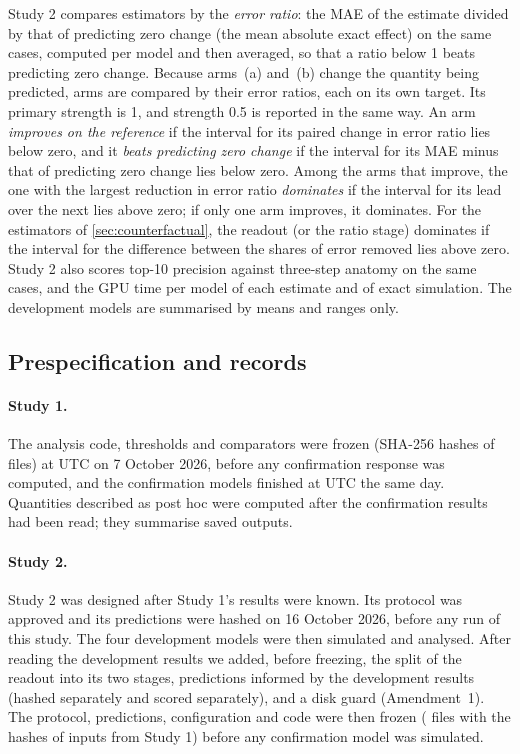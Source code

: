 Study 2 compares estimators by the \emph{error ratio}: the MAE of the estimate divided by that of predicting zero change (the mean absolute exact effect) on the same cases, computed per model and then averaged, so that a ratio below 1 beats predicting zero change. Because arms~(a) and~(b) change the quantity being predicted, arms are compared by their error ratios, each on its own target. Its primary strength is 1, and strength 0.5 is reported in the same way. An arm \emph{improves on the reference} if the interval for its paired change in error ratio lies below zero, and it \emph{beats predicting zero change} if the interval for its MAE minus that of predicting zero change lies below zero. Among the arms that improve, the one with the largest reduction in error ratio \emph{dominates} if the interval for its lead over the next lies above zero; if only one arm improves, it dominates. For the estimators of \cref{sec:counterfactual}, the readout (or the ratio stage) dominates if the interval for the difference between the shares of error removed lies above zero. Study 2 also scores top-10 precision against three-step anatomy on the same cases, and the GPU time per model of each estimate and of exact simulation. The development models are summarised by means and ranges only.

\subsection{Prespecification and records}
\label{sec:records}

\paragraph{Study 1.} The analysis code, thresholds and comparators were frozen (SHA-256 hashes of \FrozenFiles{} files) at \FreezeTime{} UTC on 7 October 2026, before any confirmation response was computed, and the confirmation models finished at \ConfirmationDoneTime{} UTC the same day. Quantities described as post hoc were computed after the confirmation results had been read; they summarise saved outputs.

\paragraph{Study 2.} Study 2 was designed after Study 1's results were known. Its protocol was approved and its \PredPrimaryTotal{} predictions were hashed on 16 October 2026, before any run of this study. The four development models were then simulated and analysed. After reading the development results we added, before freezing, the split of the readout into its two stages, \PredAddendumTotal{} predictions informed by the development results (hashed separately and scored separately), and a disk guard (Amendment~1). The protocol, predictions, configuration and code were then frozen (\FreezeFiles{} files with the hashes of \FreezeAISixInputs{} inputs from Study 1) before any confirmation model was simulated.

